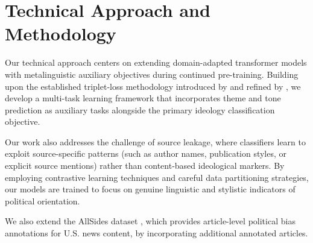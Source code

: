 \section{Technical Approach and Methodology}

Our technical approach centers on extending domain-adapted transformer models with metalinguistic auxiliary objectives during continued pre-training. Building upon the established triplet-loss methodology introduced by \citet{baly2020we} and refined by \citet{liu2022politics}, we develop a multi-task learning framework that incorporates theme and tone prediction as auxiliary tasks alongside the primary ideology classification objective.

Our work also addresses the challenge of source leakage, where classifiers learn to exploit source-specific patterns (such as author names, publication styles, or explicit source mentions) rather than content-based ideological markers. By employing contrastive learning techniques and careful data partitioning strategies, our models are trained to focus on genuine linguistic and stylistic indicators of political orientation.

We also extend the AllSides dataset \citep{baly2020we}, which provides article-level political bias annotations for U.S. news content, by incorporating additional annotated articles.
